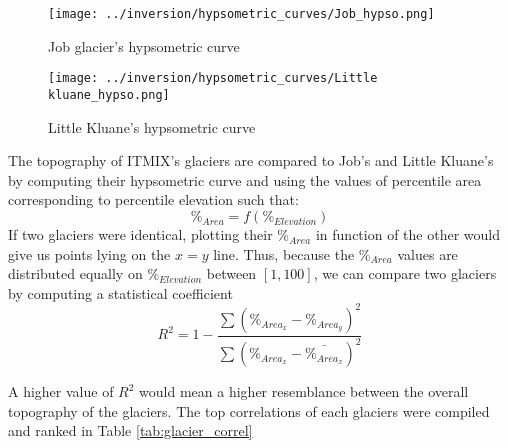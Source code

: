 \documentclass[a4, 12pt]{article}
\begin{document}
\begin{figure}[h!]
	\centering
	\texttt{[image: ../inversion/hypsometric\_curves/Job\_hypso.png]}
	\caption{Job glacier's hypsometric curve}
	\label{fig:job_hypso}
\end{figure}

\begin{figure}[h!]
	\centering
	\texttt{[image: ../inversion/hypsometric\_curves/Little kluane\_hypso.png]}
	\caption{Little Kluane's hypsometric curve}
	\label{fig:lk_hypso}
\end{figure}
The topography of ITMIX's glaciers are compared to Job's and Little Kluane's by computing their hypsometric curve and using the values of percentile area corresponding to percentile elevation such that:
\begin{equation}
\%_{Area} = f(\%_{Elevation})
\end{equation}
If two glaciers were identical, plotting their $\%_{Area}$ in function of the other would give us points lying on the $x=y$ line. Thus, because the $\%_{Area}$ values are distributed equally on $\%_{Elevation} $ between $ [1,100]$, we can compare two glaciers by computing a statistical coefficient 
\begin{equation}
R^2 = 1 - \frac{\sum(\%_{Area_x} - \%_{Area_y})^2}{\sum(\%_{Area_x} - \bar{\%_{Area_x}})^2}
\end{equation}

A higher value of $R^2$ would mean a higher resemblance between the overall topography of the glaciers.
The top correlations of each glaciers were compiled and ranked in Table \ref{tab:glacier_correl}\\
\end{document}
